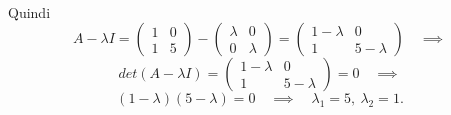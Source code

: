 \documentclass[a4paper]{report}
\begin{document}
        \paragraph{}
        Quindi
        \[
                A - \lambda I = \begin{pmatrix}
                        1 & 0 \\
                        1 & 5
                \end{pmatrix} - \begin{pmatrix}
                        \lambda & 0 \\
                        0 & \lambda
                \end{pmatrix} = \begin{pmatrix}
                        1 - \lambda & 0 \\
                        1 & 5 - \lambda
                \end{pmatrix} \quad \implies
        \]
        \[
                det(A - \lambda I) = \begin{pmatrix}
                        1 - \lambda & 0 \\
                        1 & 5 - \lambda
                \end{pmatrix} = 0 \quad \implies
        \]
        \[
                (1 - \lambda) (5 - \lambda) = 0 \quad \implies \quad \lambda_1 = 5,\ \lambda_2 = 1.
        \]
\end{document}
